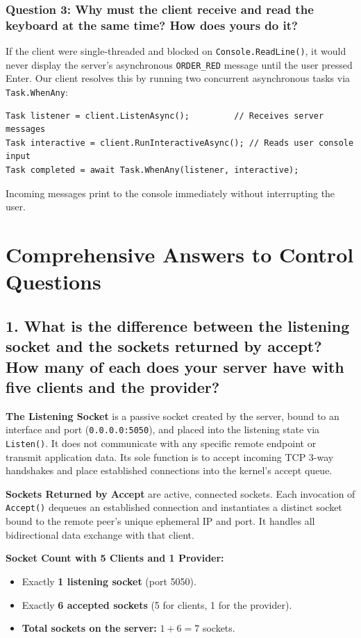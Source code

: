 \documentclass[12pt,a4paper]{article}
\begin{document}
\subsubsection{Question 3: Why must the client receive and read the keyboard at the same time? How does yours do it?}
If the client were single-threaded and blocked on \texttt{Console.ReadLine()}, it would never display the server's asynchronous \texttt{ORDER\_RED} message until the user pressed Enter. 
Our client resolves this by running two concurrent asynchronous tasks via \texttt{Task.WhenAny}:
\begin{lstlisting}
Task listener = client.ListenAsync();         // Receives server messages
Task interactive = client.RunInteractiveAsync(); // Reads user console input
Task completed = await Task.WhenAny(listener, interactive);
\end{lstlisting}
Incoming messages print to the console immediately without interrupting the user.

\section{Comprehensive Answers to Control Questions}

\subsection{1. What is the difference between the listening socket and the sockets returned by accept? How many of each does your server have with five clients and the provider?}
\textbf{The Listening Socket} is a passive socket created by the server, bound to an interface and port (\texttt{0.0.0.0:5050}), and placed into the listening state via \texttt{Listen()}. It does not communicate with any specific remote endpoint or transmit application data. Its sole function is to accept incoming TCP 3-way handshakes and place established connections into the kernel's accept queue.

\textbf{Sockets Returned by Accept} are active, connected sockets. Each invocation of \texttt{Accept()} dequeues an established connection and instantiates a distinct socket bound to the remote peer's unique ephemeral IP and port. It handles all bidirectional data exchange with that client.

\textbf{Socket Count with 5 Clients and 1 Provider:}
\begin{itemize}
    \item Exactly \textbf{1 listening socket} (port 5050).
    \item Exactly \textbf{6 accepted sockets} (5 for clients, 1 for the provider).
    \item \textbf{Total sockets on the server:} $1 + 6 = 7$ sockets.
\end{itemize}
\end{document}
